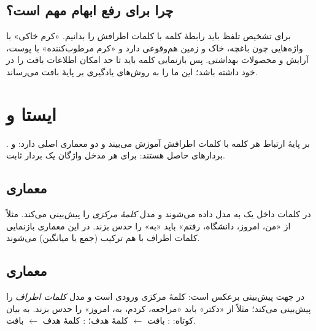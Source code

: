\subsection{چرا  برای رفع ابهام مهم است؟}
برای تشخیص تلفظ باید رابطهٔ کلمه با کلمات اطرافش را بدانیم. «کرم خاکی» با واژه‌هایی چون باغچه، خاک و زمین هم‌وقوعی دارد و «کرم مرطوب‌کننده» با پوست، آرایش و محصولات بهداشتی. پس بازنمایی کلمه باید تا حد امکان اطلاعات بافت را در خود داشته باشد؛ این ما را به روش‌های یادگیری  بر پایهٔ بافت می‌رساند.

\section{ ایستا و }

 بر پایهٔ ارتباط هر کلمه با کلمات اطرافش آموزش می‌بیند و دو معماری اصلی دارد:  و . بردارهای حاصل  هستند: برای هر مدخل واژگان یک بردار ثابت.

\subsection{معماری }
در  کلمات داخل یک  به مدل داده می‌شوند و مدل \emph{کلمهٔ مرکزی} را پیش‌بینی می‌کند. مثلاً از «من، امروز، دانشگاه، رفتم» باید «به» را حدس بزند. در این معماری بازنمایی کلمات اطراف با هم ترکیب (جمع یا میانگین) می‌شوند.

\subsection{معماری }
در  جهت پیش‌بینی برعکس است: کلمهٔ مرکزی ورودی است و مدل \emph{کلمات اطراف} را پیش‌بینی می‌کند؛ مثلاً از «دکتر» باید «مراجعه، کردم، به، امروز» را حدس بزند. به بیان کوتاه: : بافت $\leftarrow$ کلمهٔ هدف؛ : کلمهٔ هدف $\leftarrow$ بافت.

